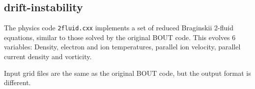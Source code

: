 \documentclass[12pt]{article}
\begin{document}
\subsection{drift-instability}

The physics code \texttt{2fluid.cxx} implements a set of reduced Braginskii 2-fluid equations,
similar to those solved by the original BOUT code.
This evolves 6 variables: Density, electron and ion temperatures, parallel ion velocity,
parallel current density and vorticity.

Input grid files are the same as the original BOUT code, but the output format is different.

\begin{figure}[htbp!]
\centering
{}
\end{figure}
\end{document}
